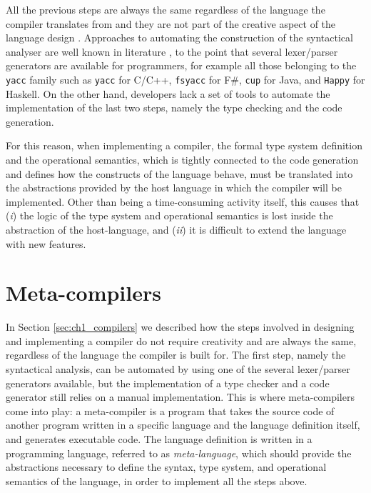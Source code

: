 All the previous steps are always the same regardless of the language the compiler translates from and they are not part of the creative aspect of the language design \cite{book1970cwic}. Approaches to automating the construction of the syntactical analyser are well known in literature \cite{mcpeak2004elkhound, nivre2006maltparser, parr1995antlr}, to the point that several lexer/parser generators are available for programmers, for example all those belonging to the \texttt{yacc} family such as \texttt{yacc} for C/C++, \texttt{fsyacc} for F\#, \texttt{cup} for Java, and \texttt{Happy} for Haskell. On the other hand, developers lack a set of tools to automate the implementation of the last two steps, namely the type checking and the code generation.

For this reason, when implementing a compiler, the formal type system definition and the operational semantics, which is tightly connected to the code generation and defines how the constructs of the language behave, must be translated into the abstractions provided by the host language in which the compiler will be implemented. Other than being a time-consuming activity itself, this causes that (\textit{i}) the logic of the type system and operational semantics is lost inside the abstraction of the host-language, and (\textit{ii}) it is difficult to extend the language with new features.

\section{Meta-compilers}
\label{sec:ch1_metacompilers}
In Section \ref{sec:ch1_compilers} we described how the steps involved in designing and implementing a compiler do not require creativity and are always the same, regardless of the language the compiler is built for. The first step, namely the syntactical analysis, can be automated by using one of the several lexer/parser generators available, but the implementation of a type checker and a code generator still relies on a manual implementation. This is where meta-compilers come into play: a meta-compiler is a program that takes the source code of another program written in a specific language and the language definition itself, and generates executable code. The language definition is written in a programming language, referred to as \textit{meta-language}, which should provide the abstractions necessary to define the syntax, type system, and operational semantics of the language, in order to implement all the steps above.


